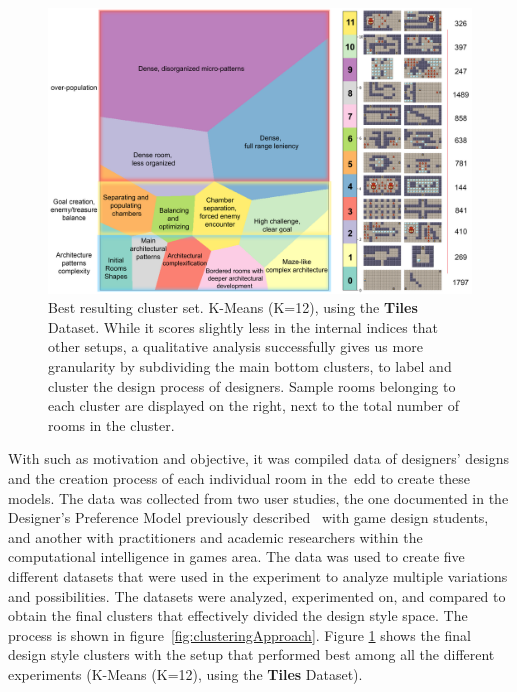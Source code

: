 \begin{figure}[t]
\centerline{\includegraphics[width=\textwidth]{figures/DesPersonas-figs/final-cluster.png}}
\caption{Best resulting cluster set. K-Means (K=12), using the \textbf{Tiles} Dataset. While it scores slightly less in the internal indices that other setups, a qualitative analysis successfully gives us more granularity by subdividing the main bottom clusters, to label and cluster the design process of designers. Sample rooms belonging to each cluster are displayed on the right, next to the total number of rooms in the cluster.} \label{fig:all-clusters}
\end{figure}

With such as motivation and objective, it was compiled data of designers' designs and the creation process of each individual room in the~\acrshort{edd} to create these models. The data was collected from two user studies, the one documented in the Designer's Preference Model previously described~\cite{Alvarez2020-DesignerPreference} with game design students, and another with practitioners and academic researchers within the computational intelligence in games area. The data was used to create five different datasets that were used in the experiment to analyze multiple variations and possibilities. The datasets were analyzed, experimented on, and compared to obtain the final clusters that effectively divided the design style space. The process is shown in figure~\ref{fig:clusteringApproach}. Figure \ref{fig:all-clusters} shows the final design style clusters with the setup that performed best among all the different experiments (K-Means (K=12), using the \textbf{Tiles} Dataset).

